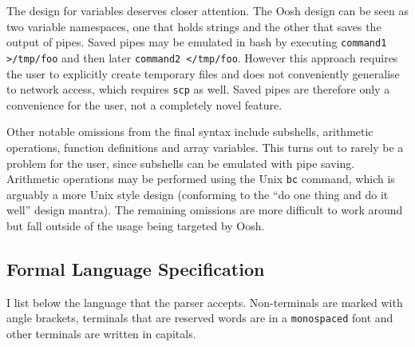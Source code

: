 \documentclass[12pt,twoside,notitlepage]{report}
\begin{document}
The design for variables deserves closer attention. The Oosh design
can be seen as two variable namespaces, one that holds strings and the
other that saves the output of pipes. Saved pipes may be emulated in
bash by executing {\tt command1 >/tmp/foo} and then later {\tt command2
  </tmp/foo}. However this approach requires the user to explicitly
create temporary files and does not conveniently generalise to network
access, which requires {\tt scp} as well. Saved pipes are therefore
only a convenience for the user, not a completely novel feature.

Other notable omissions from the final syntax include subshells,
arithmetic operations, function definitions and array variables. This
turns out to rarely be a problem for the user, since subshells can be
emulated with pipe saving. Arithmetic operations may be performed
using the Unix {\tt bc} command, which is arguably a more Unix style
design (conforming to the ``do one thing and do it well'' design
mantra). The remaining omissions are more difficult to work around but
fall outside of the usage being targeted by Oosh.

\subsection{Formal Language Specification}
I list below the language that the parser accepts. Non-terminals are
marked with angle brackets, terminals that are reserved words are in a
{\tt monospaced} font and other terminals are written in capitals.
\end{document}
